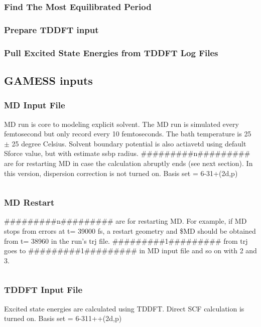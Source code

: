 \documentclass[
journal=jacsat, %
manuscript=article]{achemso}
\begin{document}
		\subsubsection{Find The Most Equilibrated Period}
		
		
		\subsubsection{Prepare TDDFT input}
		
		
		\subsubsection{Pull Excited State Energies from TDDFT Log Files}
		
		
	\subsection{GAMESS inputs}
		\subsubsection{MD Input File}
			 MD run is core to modeling explicit solvent. The MD run is simulated every femtosecond but only record every 10 femtoseconds. The bath temperature is 25 $\pm$ 25 degree Celsius. Solvent boundary potential is also actiavetd using default Sforce value, but with estimate ssbp radius. \#\#\#\#\#\#\#\#\#n\#\#\#\#\#\#\#\#\# are for restarting MD in case the calculation abruptly ends (see next section). In this version, dispersion correction is not turned on. Basis set = 6-31+(2d,p)
			 \inputminted[linenos, breaklines, baselinestretch=1, fontsize=\small]{Perl}{../GAMESSinpSample/MD_aniline32.inp}
			 
		\subsubsection{MD Restart}
		\#\#\#\#\#\#\#\#\#n\#\#\#\#\#\#\#\#\# are for restarting MD. For example, if MD stops from errors at t= 39000 fs, a restart geometry and \$MD should be obtained from t= 38960 in the run's trj file. \#\#\#\#\#\#\#\#\#1\#\#\#\#\#\#\#\#\# from trj goes to \#\#\#\#\#\#\#\#\#1\#\#\#\#\#\#\#\#\# in MD input file and so on with 2 and 3.
		\inputminted[linenos, breaklines, baselinestretch=1, fontsize=\small]{Perl}{../GAMESSinpSample/MD_aniline32.trj}
		
		\subsubsection{TDDFT Input File}
			Excited state energies are calculated using TDDFT. Direct SCF calculation is turned on. Basis set = 6-311++(2d,p)
			\inputminted[linenos, breaklines, baselinestretch=1, fontsize=\small]{Perl}{../GAMESSinpSample/TDDFT_aniline32_15010.inp}
\end{document}
